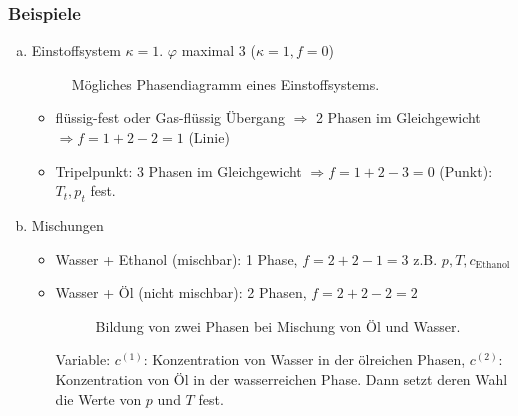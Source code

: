 \subsubsection{Beispiele}
\begin{enumerate}[a)]
    \item Einstoffsystem $\kappa = 1$. $\varphi$ maximal 3 ($\kappa = 1, f = 0$)
    
    \begin{figure}[H]
        \centering
        \def\svgwidth{0.5\textwidth}
        
        \caption{Mögliches Phasendiagramm eines Einstoffsystems.}
        \label{img:pT-Gibbs}
    \end{figure}
    
    \begin{itemize}
        \item flüssig-fest oder Gas-flüssig Übergang $\Rightarrow$ 2 Phasen im Gleichgewicht $\Rightarrow f = 1 + 2 -2 = 1$ (Linie)
        \item Tripelpunkt: 3 Phasen im Gleichgewicht $\Rightarrow f = 1 + 2 - 3 = 0$ (Punkt): $T_t, p_t$ fest.
    \end{itemize}
    \item Mischungen
    \begin{itemize}
        \item Wasser + Ethanol (mischbar): 1 Phase, $f = 2 + 2 - 1 = 3$ z.B. $p, T, c_\text{Ethanol}$
        \item Wasser + Öl (nicht mischbar): 2 Phasen, $f = 2 + 2 - 2 = 2 $ 
                
        \begin{figure}[H]
            \centering
            \def\svgwidth{0.4\textwidth}
            
            \caption{Bildung von zwei Phasen bei Mischung von Öl und Wasser.}
            \label{img:Water-Oil}
        \end{figure}
        
        Variable: $c^{(1)}$: Konzentration von Wasser in der ölreichen Phasen, $c^{(2)}$: Konzentration von Öl in der wasserreichen Phase.
        Dann setzt deren Wahl die Werte von $p$ und $T$ fest.
    \end{itemize}
\end{enumerate}

